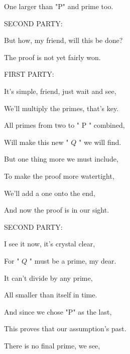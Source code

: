 \documentclass[10pt]{article}
\begin{document}
\hspace*{1em} One larger than "P" and prime too.

\hspace*{1em} SECOND PARTY:

\hspace*{1em} But how, my friend, will this be done?

\hspace*{1em} The proof is not yet fairly won.

\hspace*{1em} FIRST PARTY:

\hspace*{1em} It's simple, friend, just wait and see,

\hspace*{1em} We'll multiply the primes, that's key.

\hspace*{1em} All primes from two to " \(\mathrm{P}\) " combined,

\hspace*{1em} Will make this new " \(Q\) " we will find.

\hspace*{1em} But one thing more we must include,

\hspace*{1em} To make the proof more watertight,

\hspace*{1em} We'll add a one onto the end,

\hspace*{1em} And now the proof is in our sight.

\hspace*{1em} SECOND PARTY:

\hspace*{1em} I see it now, it's crystal clear,

\hspace*{1em} For " \(Q\) " must be a prime, my dear.

\hspace*{1em} It can't divide by any prime,

\hspace*{1em} All smaller than itself in time.

\hspace*{1em} And since we chose "P" as the last,

\hspace*{1em} This proves that our assumption's past.

\hspace*{1em} There is no final prime, we see,
\end{document}
